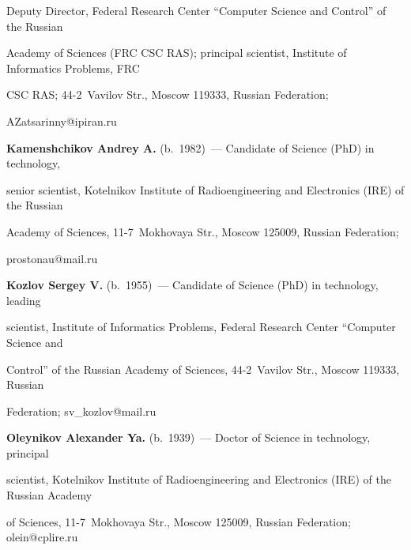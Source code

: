 Deputy Director, Federal Research Center ``Computer Science and Control'' of the Russian 

Academy of Sciences (FRC CSC RAS); principal scientist, Institute of Informatics Problems, FRC 

CSC RAS; 44-2~Vavilov Str., Moscow 119333, Russian Federation; 

\mbox{AZatsarinny@ipiran.ru} 



\vspace*{3pt}





\noindent

\textbf{Kamenshchikov Andrey A.} (b.\ 1982)~--- Candidate of Science (PhD) in technology, 

senior scientist, Kotelnikov Institute of Radioengineering and Electronics (IRE) of the Russian 

Academy of Sciences, 11-7~Mokhovaya Str., Moscow 125009, Russian Federation; 

\mbox{prostonau@mail.ru}



\vspace*{3pt}



\noindent

\textbf{Kozlov Sergey V.} (b.\ 1955)~--- Candidate of Science (PhD) in technology, leading 

scientist, Institute of Informatics Problems, Federal Research Center ``Computer Science and 

Control'' of the Russian Academy of Sciences, 44-2~Vavilov Str., Moscow 119333, Russian 

Federation; \mbox{sv\_kozlov@mail.ru}    



\vspace*{3pt}



\noindent

\textbf{Oleynikov Alexander Ya.} (b.\ 1939)~--- Doctor of Science in technology, principal 

scientist, Kotelnikov Institute of Radioengineering and Electronics (IRE) of the Russian Academy 

of Sciences, 11-7~Mokhovaya Str., Moscow 125009, Russian Federation; \mbox{olein@cplire.ru} 



\vspace*{3pt}



